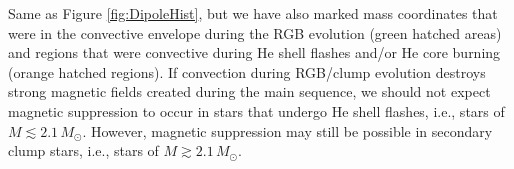 \label{fig:DipoleHistConv}
Same as Figure \ref{fig:DipoleHist}, but we have also marked mass coordinates that were in the convective envelope during the RGB evolution (green hatched areas) and regions that were convective during He shell flashes and/or He core burning (orange hatched regions). If convection during RGB/clump evolution destroys strong magnetic fields created during the main sequence, we should not expect magnetic suppression to occur in stars that undergo He shell flashes, i.e., stars of $M \lesssim 2.1 \, M_\odot$. However, magnetic suppression may still be possible in secondary clump stars, i.e., stars of $M \gtrsim 2.1 \, M_\odot$.
  